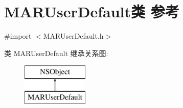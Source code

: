 \hypertarget{interface_m_a_r_user_default}{}\section{M\+A\+R\+User\+Default类 参考}
\label{interface_m_a_r_user_default}


{\ttfamily \#import $<$M\+A\+R\+User\+Default.\+h$>$}

类 M\+A\+R\+User\+Default 继承关系图\+:\begin{figure}[H]
\begin{center}
\leavevmode
\includegraphics[height=2.000000cm]{interface_m_a_r_user_default}
\end{center}
\end{figure}
